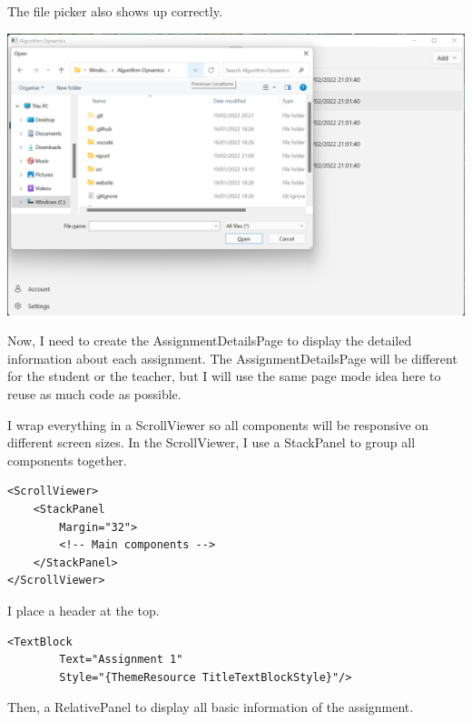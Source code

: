 \documentclass[a4paper]{report}
\begin{document}
The file picker also shows up correctly.

\includegraphics[width=\textwidth, height=\textheight, keepaspectratio]{AssignmentsPage-FilePicker}

Now, I need to create the AssignmentDetailsPage to display the detailed information about each assignment. The AssignmentDetailsPage will be different for the student or the teacher, but I will use the same page mode idea here to reuse as much code as possible.

I wrap everything in a ScrollViewer so all components will be responsive on different screen sizes. In the ScrollViewer, I use a StackPanel to group all components together.

\begin{verbatim}
<ScrollViewer>
    <StackPanel
        Margin="32">
        <!-- Main components -->
    </StackPanel>
</ScrollViewer>
\end{verbatim}

I place a header at the top.

\begin{verbatim}
<TextBlock
        Text="Assignment 1"
        Style="{ThemeResource TitleTextBlockStyle}"/>
\end{verbatim}

Then, a RelativePanel to display all basic information of the assignment.
\end{document}

